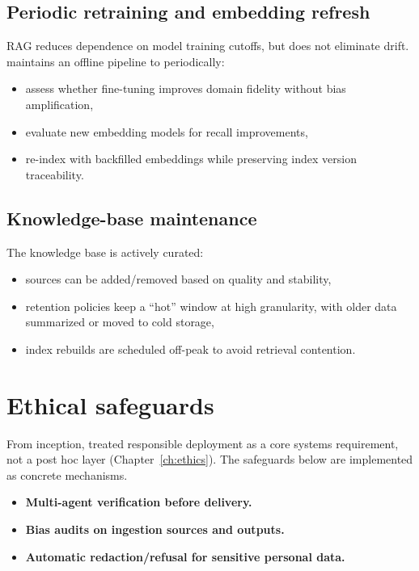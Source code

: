 \subsection{Periodic retraining and embedding refresh}
\label{sec:ishtar-retraining}

RAG reduces dependence on model training cutoffs, but does not eliminate drift.
\ishtar{} maintains an offline pipeline to periodically:
\begin{itemize}
    \item assess whether fine-tuning improves domain fidelity without bias amplification,
    \item evaluate new embedding models for recall improvements,
    \item re-index with backfilled embeddings while preserving index version traceability.
\end{itemize}

\subsection{Knowledge-base maintenance}
\label{sec:ishtar-kb-maintenance}

The knowledge base is actively curated:
\begin{itemize}
    \item sources can be added/removed based on quality and stability,
    \item retention policies keep a ``hot'' window at high granularity, with older data summarized or moved to cold storage,
    \item index rebuilds are scheduled off-peak to avoid retrieval contention.
\end{itemize}

\section{Ethical safeguards}
\label{sec:ishtar-ethics}

From inception, \ishtar{} treated responsible deployment as a core systems requirement, not a post hoc layer (Chapter~\ref{ch:ethics}).
The safeguards below are implemented as concrete mechanisms.

\begin{itemize}
    \item \textbf{Multi-agent verification before delivery.}
    \item \textbf{Bias audits on ingestion sources and outputs.}
    \item \textbf{Automatic redaction/refusal for sensitive personal data.}
\end{itemize}

